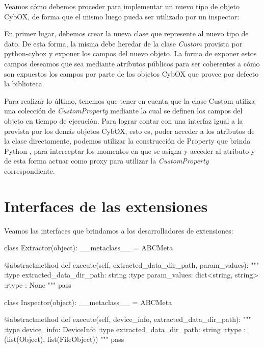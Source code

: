 Veamos cómo debemos proceder para implementar un nuevo tipo de objeto CybOX, de forma que el mismo luego pueda ser utilizado por un inspector:

En primer lugar, debemos crear la nueva clase que represente al nuevo tipo de dato. De esta forma, la misma debe heredar de la clase \emph{Custom} provista por python-cybox y exponer los campos del nuevo objeto. La forma de exponer estos campos deseamos que sea mediante atributos públicos para ser coherentes a cómo son expuestos los campos por parte de los objetos CybOX que provee por defecto la biblioteca.

Para realizar lo último, tenemos que tener en cuenta que la clase Custom utiliza una colección de \emph{CustomProperty} mediante la cual se definen los campos del objeto en tiempo de ejecución. Para lograr contar con una interfaz igual a la provista por los demás objetos CybOX, esto es, poder acceder a los atributos de la clase directamente, podemos utilizar la construcción de Property que brinda Python \cite{python-property-class}, para interceptar los momentos en que se asigna y acceder al atributo y de esta forma actuar como proxy para utilizar la \emph{CustomProperty} correspondiente.

\section{Interfaces de las extensiones}
Veamos las interfaces que brindamos a los desarrolladores de extensiones:
\newline

\begin{python}[title=Interfaces brindadas a los desarrolladores, captionpos=b]
class Extractor(object):
    __metaclass__ = ABCMeta

    @abstractmethod
    def execute(self, extracted_data_dir_path, param_values):
        """
        :type extracted_data_dir_path: string
        :type param_values: dict<string, string>
        :rtype : None
        """
        pass

class Inspector(object):
    __metaclass__ = ABCMeta

    @abstractmethod
    def execute(self, device_info, extracted_data_dir_path):
        """
        :type device_info: DeviceInfo
        :type extracted_data_dir_path: string
        :rtype : (list(Object), list(FileObject))
        """
        pass

\end{python}

